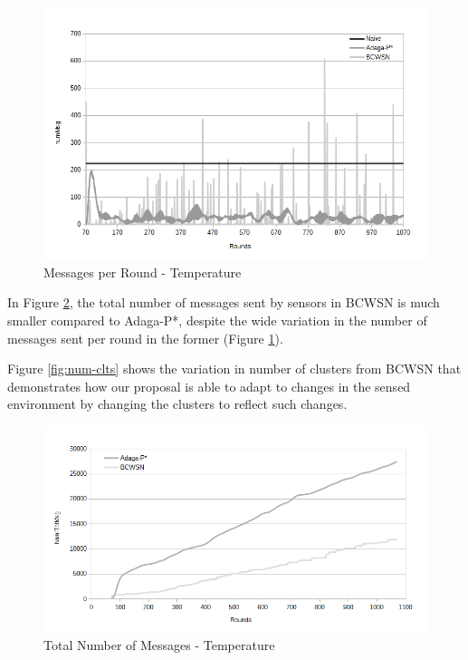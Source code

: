 \documentclass{acm_proc_article-sp}
\begin{document}
\begin{figure}[!htb]
\begin{center}
	\includegraphics[scale=0.4]{BCWSN-NumMsgPerRoundxRound-PB.png}
	 \vspace*{-.6cm}
    \caption{Messages per Round - Temperature}

    \label{fig:num-msg}
\end{center}
\end{figure}

In Figure \ref{fig:tot-num-msg}, the total number of messages sent
by sensors in BCWSN is much smaller compared to Adaga-P*, despite the wide variation 
in the number of messages sent per round in the former (Figure \ref{fig:num-msg}).

Figure \ref{fig:num-clts} shows the variation in number of clusters from BCWSN 
that demonstrates how our proposal is able to adapt to changes in the sensed 
environment by changing the clusters to reflect such changes.

\begin{figure}[!htb]
\begin{center}
	\includegraphics[scale=0.40]{BCWSN-TotNumMsgxRound-PB-2Appr.png}
	 \vspace*{-.6cm}
    \caption{Total Number of Messages - Temperature}
    \label{fig:tot-num-msg}
\end{center}
\end{figure}
\vspace*{-.3cm}
\end{document}
